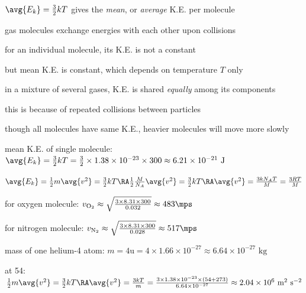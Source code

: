 \cmt $\avg{E_k} = \frac{3}{2}k T$ gives the \emph{mean}, or \emph{average} K.E. per molecule

gas molecules exchange energies with each other upon collisions

for an individual molecule, its K.E. is not a constant

but mean K.E. is constant, which depends on temperature $T$ only

\cmt in a mixture of several gases, K.E. is shared \emph{equally} among its components

this is because of repeated collisions between particles

though all molecules have same K.E., heavier molecules will move more slowly





\sol mean K.E. of single molecule: $\avg{E_k} = \frac{3}{2}kT = \frac{3}{2} \times 1.38\times10^{-23} \times 300 \approx 6.21\times 10^{-21} \text{ J}$

{
	
	\centering
	
	$\avg{E_k} = \frac{1}{2}m\avg{v^2} = \frac{3}{2} kT \RA \frac{1}{2} \frac{M}{N_A} \avg{v^2} = \frac{3}{2} kT \RA \avg{v^2} = \frac{3kN_AT}{M} = \frac{3RT}{M}$
	
}

\eqyskip

for oxygen molecule: $v_\text{O$_2$} \approx  \sqrt{\frac{3\times8.31\times300}{0.032}} \approx 483 \mps$

\eqyskip

for nitrogen molecule: $v_\text{N$_2$} \approx  \sqrt{\frac{3\times8.31\times300}{0.028}} \approx 517 \mps$ \eoe


\sol mass of one helium-4 atom: $m=4\text{u} = 4\times 1.66\times10^{-27} \approx 6.64\times10^{-27} \text{ kg}$

at 54\OC: $\, \frac{1}{2}m\avg{v^2} = \frac{3}{2}kT \RA \avg{v^2} = \frac{3kT}{m} = \frac{3\times1.38\times10^{-23}\times(54+273)}{6.64\times10^{-27}} \approx 2.04 \times 10^6 \text{ m}^2 \text{ s}^{-2}$

